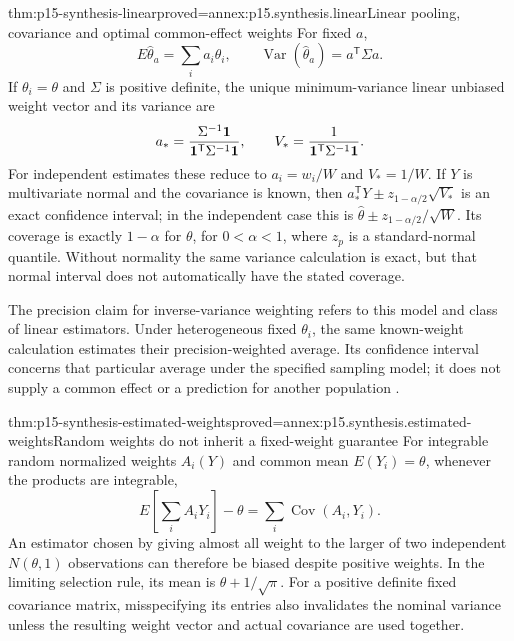 \begin{hbtheorem}{thm:p15-synthesis-linear}{proved=annex:p15.synthesis.linear}{Linear pooling, covariance and optimal common-effect weights}
For fixed \(a\),
\[
 E\widehat\theta_a=\sum_i a_i\theta_i,
 \qquad \operatorname{Var}(\widehat\theta_a)=a^{\mathsf T}\Sigma a.
\]
If \(\theta_i=\theta\) and \(\Sigma\) is positive definite, the
unique minimum-variance linear unbiased weight vector and its variance are
\[
 a_*={\Sigma^{-1}\mathbf1\over\mathbf1^{\mathsf T}\Sigma^{-1}\mathbf1},
 \qquad V_*={1\over\mathbf1^{\mathsf T}\Sigma^{-1}\mathbf1}.
\]
For independent estimates these reduce to \(a_i=w_i/W\) and
\(V_*=1/W\). If \(Y\) is multivariate normal and the covariance
is known, then \(a_*^{\mathsf T}Y\pm z_{1-\alpha/2}\sqrt{V_*}\)
is an exact confidence interval; in the independent case this is
\(\widehat\theta\pm z_{1-\alpha/2}/\sqrt W\). Its coverage is exactly
\(1-\alpha\) for \(\theta\), for
\(0<\alpha<1\), where \(z_p\) is a standard-normal quantile.
Without normality the same variance calculation is exact, but that normal
interval does not automatically have the stated coverage.
\end{hbtheorem}

The precision claim for inverse-variance weighting refers to this model and
class of linear estimators. Under heterogeneous fixed \(\theta_i\), the
same known-weight calculation estimates their precision-weighted average.
Its confidence interval concerns that particular average under the specified
sampling model; it does not supply a common effect or a prediction for another
population \cite[secs.~10.3.1, 10.10.4.1]{DeeksEtAl2024Cochrane10}.

\begin{hbtheorem}{thm:p15-synthesis-estimated-weights}{proved=annex:p15.synthesis.estimated-weights}{Random weights do not inherit a fixed-weight guarantee}
For integrable random normalized weights \(A_i(Y)\) and common mean
\(E(Y_i)=\theta\), whenever the products are integrable,
\[
 E\!\left[\sum_i A_iY_i\right]-\theta
       =\sum_i\operatorname{Cov}(A_i,Y_i).
\]
An estimator chosen by giving almost all weight to the larger of two
independent \(N(\theta,1)\) observations can therefore be biased despite
positive weights. In the limiting selection rule, its mean is
\(\theta+1/\sqrt\pi\). For a positive definite fixed covariance
matrix, misspecifying its entries also invalidates the nominal variance
unless the resulting weight vector and actual covariance are used together.
\end{hbtheorem}

